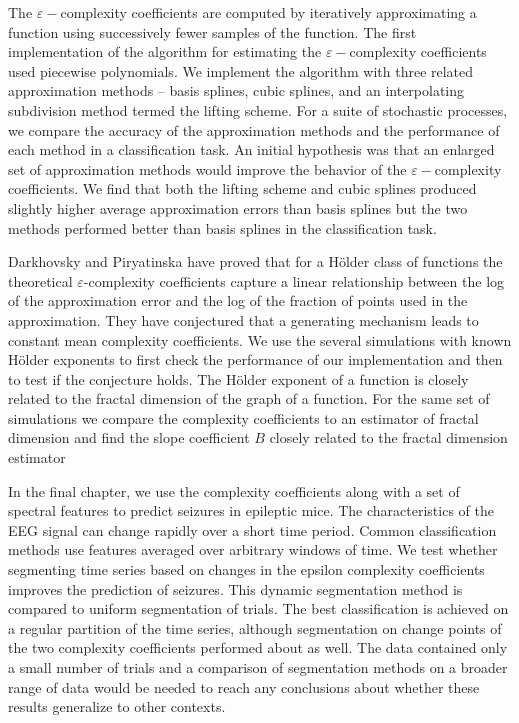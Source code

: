 The $\varepsilon-$complexity coefficients are computed by iteratively approximating a function using successively fewer samples of the function. The first implementation of the algorithm for estimating the $\varepsilon-$complexity coefficients
used piecewise polynomials. We implement the algorithm with three related approximation methods -- basis splines, cubic splines, and an interpolating subdivision 
method termed the lifting scheme. For a suite of stochastic processes, we compare the accuracy of the approximation methods and the performance of each method in a classification task. An initial hypothesis was that an enlarged set of approximation
methods would improve the 
behavior of the $\varepsilon-$complexity coefficients.
We find that both the lifting scheme 
and cubic splines produced slightly higher average approximation errors than basis splines but the two methods performed better than basis splines in the classification task.

Darkhovsky and Piryatinska have proved that for a H\"older class of functions the theoretical $\varepsilon$-complexity coefficients capture a linear relationship between the log of the approximation error and the log of the fraction of points used in the approximation. They have conjectured
that a generating mechanism leads to constant mean 
complexity coefficients.
 We use the several simulations with known H\"older 
 exponents to first check the performance of our implementation 
 and then to test if the conjecture holds. The H\"older exponent
 of a function is closely related to the fractal dimension 
 of the graph of a function. For the same set of simulations 
 we compare the complexity 
 coefficients to an estimator of fractal dimension and 
 find the slope coefficient $B$ closely related to the 
fractal dimension estimator

In the final chapter, we use the complexity coefficients
along with a set of spectral features to predict seizures in epileptic mice. The characteristics of the EEG signal can change rapidly over a short time period. Common classification methods use features averaged over arbitrary windows of time. 
We test whether segmenting time series based on changes in the epsilon complexity coefficients improves the prediction of seizures. This dynamic segmentation method is compared to uniform segmentation of trials. 
The best classification is achieved on a regular partition of the time series, although segmentation on change points of the two complexity coefficients performed about as well. The data contained only a small number of trials and a comparison of segmentation methods on a broader range of data would be needed to reach any conclusions about whether these results 
generalize to other contexts.

